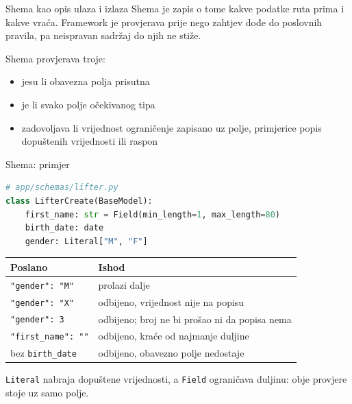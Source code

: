 
\begin{frame}{Shema kao opis ulaza i izlaza}
Shema je zapis o tome kakve podatke ruta prima i kakve vraća. Framework je provjerava prije nego zahtjev dođe do poslovnih pravila, pa neispravan sadržaj do njih ne stiže.

\vspace{1.1em}
Shema provjerava troje:

\vspace{0.8em}
\begin{itemize}
  \itemsep0.7em
  \item jesu li obavezna polja prisutna
  \item je li svako polje očekivanog tipa
  \item zadovoljava li vrijednost ograničenje zapisano uz polje, primjerice popis dopuštenih vrijednosti ili raspon
\end{itemize}
\end{frame}

\begin{frame}[fragile]{Shema: primjer}
\begin{lstlisting}[language=python]
# app/schemas/lifter.py
class LifterCreate(BaseModel):
    first_name: str = Field(min_length=1, max_length=80)
    birth_date: date
    gender: Literal["M", "F"]
\end{lstlisting}

\vspace{0.4em}
{\small
\begin{tabular}{@{}lL{7.2cm}@{}}
  \toprule
  \textbf{Poslano} & \textbf{Ishod} \\
  \midrule
  \texttt{"gender": "M"}   & prolazi dalje \\
  \texttt{"gender": "X"}   & odbijeno, vrijednost nije na popisu \\
  \texttt{"gender": 3}     & odbijeno; broj ne bi prošao ni da popisa nema \\
  \texttt{"first\_name": ""} & odbijeno, kraće od najmanje duljine \\
  bez \texttt{birth\_date}  & odbijeno, obavezno polje nedostaje \\
  \bottomrule
\end{tabular}
}

\vspace{0.4em}
\texttt{Literal} nabraja dopuštene vrijednosti, a \texttt{Field} ograničava duljinu: obje provjere stoje uz samo polje.
\end{frame}

